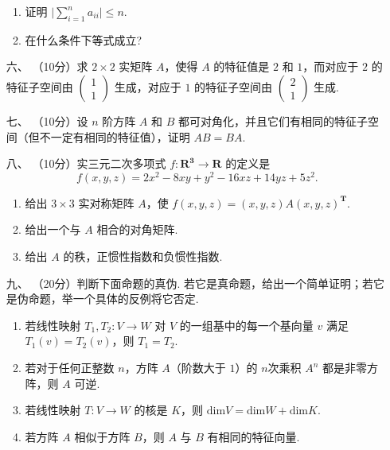 \begin{enumerate}
    \begin{enumerate}[label=(\arabic*)]
        \item 证明 $\lvert\sum\limits_{i=1}^n{a_{ii}}\rvert \leq n$.
        \item 在什么条件下等式成立?
    \end{enumerate}
    \item [六、]（10分）求 $2\times 2$ 实矩阵 $A$，使得 $A$ 的特征值是 $2$ 和 $1$，而对应于 $2$ 的特征子空间由 $\begin{pmatrix}1 \\ 1\end{pmatrix}$
    生成，对应于 $1$ 的特征子空间由 $\begin{pmatrix}2 \\ 1\end{pmatrix}$ 生成.
    \item [七、]（10分）设 $n$ 阶方阵 $A$ 和 $B$ 都可对角化，并且它们有相同的特征子空间（但不一定有相同的特征值），证明 $AB=BA.$
    \item [八、]（10分）实三元二次多项式 $f:\mathbf{R^3}\to \mathbf{R}$ 的定义是
    \[f(x,y,z) = 2x^2-8xy+y^2-16xz+14yz+5z^2.\]
    \begin{enumerate}[label=(\arabic*)]
        \item 给出 $3\times 3$ 实对称矩阵 $A$，使 $f(x,y,z) = (x,y,z)A(x,y,z)^{\mathbf{T}}.$
        \item 给出一个与 $A$ 相合的对角矩阵.
        \item 给出 $A$ 的秩，正惯性指数和负惯性指数.
    \end{enumerate}
    \item [九、]（20分）判断下面命题的真伪. 若它是真命题，给出一个简单证明；若它是伪命题，举一个具体的反例将它否定.
    \begin{enumerate}[label=(\arabic*)]
        \item 若线性映射 $T_1,T_2:V \to W$ 对 $V$ 的一组基中的每一个基向量 $v$ 满足 $T_1(v)=T_2(v)$，则 $T_1=T_2.$
        \item 若对于任何正整数 $n$，方阵 $A$（阶数大于 $1$）的 $n$次乘积 $A^n$ 都是非零方阵，则 $A$ 可逆.
        \item 若线性映射 $T:V\to W$ 的核是 $K$，则 $\mathrm{dim}V=\mathrm{dim}W+\mathrm{dim}K.$
        \item 若方阵 $A$ 相似于方阵 $B$，则 $A$ 与 $B$ 有相同的特征向量.
    \end{enumerate}
\end{enumerate}

\clearpage
